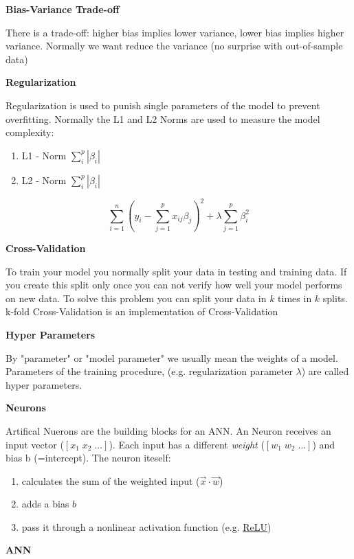 \documentclass[11pt,twoside,landscape]{article}
\begin{document}
\begin{multicols}{3}
\textbf{Bias-Variance Trade-off}

There is a trade-off: higher bias implies lower variance, lower bias implies higher variance.
Normally we want reduce the variance (no surprise with out-of-sample data)


\textbf{Regularization}

Regularization is used to punish single parameters of the model to prevent overfitting.
Normally the L1 and L2 Norms are used to measure the model complexity:
\begin{enumerate}
\item L1 - Norm \(\sum_i^p |\beta_i|\)
\item L2 - Norm \(\sum_i^p |\beta_i|\)
\end{enumerate}

\begin{equation}
  \sum_{i=1}^n(y_i - \sum_{j=1}^p x_{ij}\beta_j)^2 + \lambda \sum_{j=1}^p\beta_i^2
\end{equation}


\textbf{Cross-Validation}

To train your model you normally split your data in testing and training data.
If you create this split only once you can not verify how well your model performs on new data.
To solve this problem you can split your data in \(k\) times in \(k\) splits.
k-fold Cross-Validation is an implementation of Cross-Validation


\textbf{Hyper Parameters}

By "parameter" or "model parameter" we usually mean the weights of a model.
Parameters of the training procedure, (e.g. regularization parameter \(\lambda\)) are called hyper parameters.

\textbf{Neurons}

Artifical Nuerons are the building blocks for an ANN.
An Neuron receives an input vector (\([x_1 \; x_2 \; \ldots]\)).
Each input has a different \emph{weight} (\([w_1 \; w_2 \; \ldots]\)) and bias b (=intercept).
The neuron iteself:
\begin{enumerate}
\item calculates the sum of the weighted input (\(\vec{x} \cdot \vec{w}\))
\item adds a bias \(b\)
\item pass it through a nonlinear activation function (e.g. \href{../../../roam/20211214121924-relu.org}{ReLU})
\end{enumerate}


\textbf{ANN}


\end{multicols}
\end{document}
